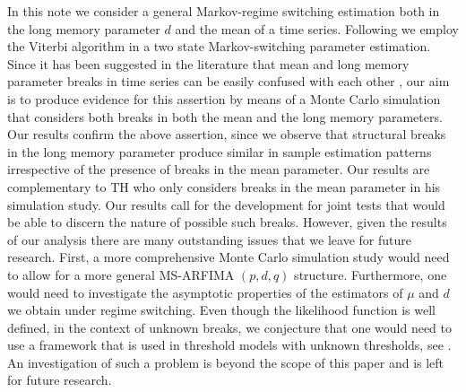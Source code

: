 \documentclass[11pt,fleqn]{article}
\begin{document}
{In this note we consider a general Markov-regime switching estimation both
in the long memory parameter $d$ and the mean of a time series. Following 
\cite{Tsay2009} we employ the Viterbi algorithm in a two state
Markov-switching parameter estimation. Since it has been suggested in the
literature that mean and long memory parameter breaks in time series can be
easily confused with each other \cite{Diebold2001}, our aim is to produce
evidence for this assertion by means of a Monte Carlo simulation that
considers both breaks in both the mean and the long memory parameters. Our
results confirm the above assertion, since we observe that structural breaks
in the long memory parameter produce similar in sample estimation patterns
irrespective of the presence of breaks in the mean parameter. Our results
are complementary to TH who only considers breaks in the mean parameter in
his simulation study. Our results call for the development for joint tests
that would be able to discern the nature of possible such breaks. 
However, given the results of our analysis there are many outstanding issues
that we leave for future research. First, a more comprehensive Monte Carlo
simulation study would need to allow for a more general MS-ARFIMA $(p,d,q)$%
structure. Furthermore, one would need to investigate the
asymptotic properties of the estimators of $\mu $ and $d$%
 we obtain under regime switching. Even though the likelihood
function is well defined, in the context of unknown breaks, we conjecture
that  one would need to use a framework that is used in threshold models
with unknown thresholds, see \cite{Hansen2000}. An investigation of such a
problem is beyond the scope of this paper and is left for future research.  



\clearpage

\begin{landscape}
	
	\begin{table}[!ht]
		

\end{table}
\end{landscape}}
\end{document}
